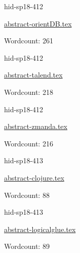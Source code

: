 

\begin{IU}

hid-sp18-412

\href{https://github.com/cloudmesh-community/hid-sp18-412/blob/master//technology/abstract-orientDB.tex}{abstract-orientDB.tex}

 

Wordcount: 261

\end{IU}



\begin{IU}

hid-sp18-412

\href{https://github.com/cloudmesh-community/hid-sp18-412/blob/master//technology/abstract-talend.tex}{abstract-talend.tex}

 

Wordcount: 218

\end{IU}



\begin{IU}

hid-sp18-412

\href{https://github.com/cloudmesh-community/hid-sp18-412/blob/master//technology/abstract-zmanda.tex}{abstract-zmanda.tex}

 

Wordcount: 216

\end{IU}



\begin{IU}

hid-sp18-413

\href{https://github.com/cloudmesh-community/hid-sp18-413/blob/master//technology/abstract-clojure.tex}{abstract-clojure.tex}

 

Wordcount: 88

\end{IU}



\begin{IU}

hid-sp18-413

\href{https://github.com/cloudmesh-community/hid-sp18-413/blob/master//technology/abstract-logicalglue.tex}{abstract-logicalglue.tex}

 

Wordcount: 89

\end{IU}

